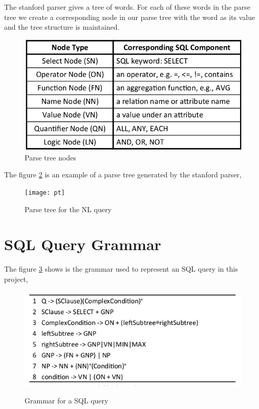 The stanford parser gives a tree of words. For each of these words in the parse tree we create a corresponding node in our parse tree with the word as its value and the tree structure is maintained. 


\begin{figure}[htb]
\centering
\includegraphics[scale=0.55]{nodes} %
\caption{Parse tree nodes}
\label{fig:aa} %
\end{figure}


The figure \ref{fig:vv} is an example of a parse tree generated by the stanford parser,
\newpage


\begin{figure}[htb]
\centering
\texttt{[image: pt]} %
\caption{Parse tree for the NL query}
\label{fig:vv} %
\end{figure}

\section{SQL Query Grammar }
The figure \ref{fig:grammara} shows is the grammar used to represent an SQL query in this project,

\begin{figure}[htb]
\centering
\includegraphics[scale=0.45]{./gram} %
\caption{Grammar for a SQL query}
\label{fig:grammara} %
\cite{eleven}
\end{figure}

